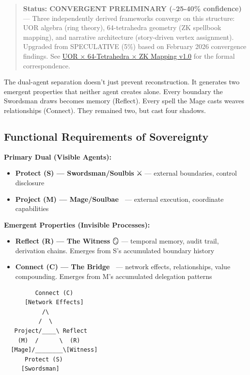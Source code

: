 \documentclass[
  11pt,
]{article}
\begin{document}
\begin{quote}
\textbf{Status: CONVERGENT PRELIMINARY (\textasciitilde25-40\%
confidence)} --- Three independently derived frameworks converge on this
structure: UOR algebra (ring theory), 64-tetrahedra geometry (ZK
spellbook mapping), and narrative architecture (story-driven vertex
assignment). Upgraded from SPECULATIVE (5\%) based on February 2026
convergence findings. See \href{uor_tetrahedra_zk_mapping_v1_0.md}{UOR ×
64-Tetrahedra × ZK Mapping v1.0} for the formal correspondence.
\end{quote}

The dual-agent separation doesn't just prevent reconstruction. It
generates two emergent properties that neither agent creates alone.
Every boundary the Swordsman draws becomes memory (Reflect). Every spell
the Mage casts weaves relationships (Connect). They remained two, but
cast four shadows.

\subsection{Functional Requirements of
Sovereignty}\label{functional-requirements-of-sovereignty}

\textbf{Primary Dual (Visible Agents):}

\begin{itemize}
\item
  \textbf{Protect (S) --- Swordsman/Soulbis} ⚔️ --- external boundaries,
  control disclosure
\item
  \textbf{Project (M) --- Mage/Soulbae} 🧙 --- external execution,
  coordinate capabilities
\end{itemize}

\textbf{Emergent Properties (Invisible Processes):}

\begin{itemize}
\item
  \textbf{Reflect (R) --- The Witness} 🪞 --- temporal memory, audit
  trail, derivation chains. Emerges from S's accumulated boundary
  history
\item
  \textbf{Connect (C) --- The Bridge} 🤝 --- network effects,
  relationships, value compounding. Emerges from M's accumulated
  delegation patterns
\end{itemize}

\begin{verbatim}
         Connect (C)
      [Network Effects]
           /\
          /  \
   Project/____\ Reflect
    (M)  /      \  (R)
  [Mage]/________\[Witness]
      Protect (S)
     [Swordsman]
\end{verbatim}
\end{document}
